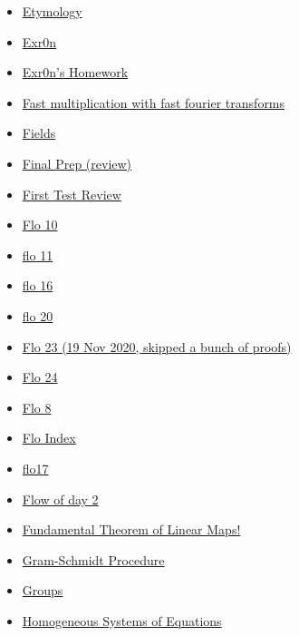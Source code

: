 \documentclass[11pt]{article}
\begin{document}
\begin{itemize}
\begin{itemize}
\begin{itemize}
\item \href{mathematics/linear\_algebra/KBe2020math530floLinalgEtymology.org}{Etymology}
\item \href{mathematics/linear\_algebra/KBe20math530flo12.org}{Exr0n}
\item \href{mathematics/linear\_algebra/KBe2020math530refExr0nRetIndex.org}{Exr0n's Homework}
\item \href{mathematics/linear\_algebra/KBe21math530floFastMultiplicationWithFFT.org}{Fast multiplication with fast fourier transforms}
\item \href{mathematics/linear\_algebra/KBe20math530refField.org}{Fields}
\item \href{mathematics/linear\_algebra/KBe20math530refFallFinalPrep.org}{Final Prep (review)}
\item \href{mathematics/linear\_algebra/KBxFirstTestReview.org}{First Test Review}
\item \href{mathematics/linear\_algebra/KBe20math530flo10.org}{Flo 10}
\item \href{mathematics/linear\_algebra/KBe20math530flo11.org}{flo 11}
\item \href{mathematics/linear\_algebra/KBe20math530flo16.org}{flo 16}
\item \href{mathematics/linear\_algebra/KBe20math530flo21.org}{flo 20}
\item \href{mathematics/linear\_algebra/KBe20math530flo23.org}{Flo 23 (19 Nov 2020, skipped a bunch of proofs)}
\item \href{mathematics/linear\_algebra/KBe20math530flo24.org}{Flo 24}
\item \href{mathematics/linear\_algebra/Kbe20math530flo8.org}{Flo 8}
\item \href{mathematics/linear\_algebra/KBe2020math530floIndex.org}{Flo Index}
\item \href{mathematics/linear\_algebra/KBe20math530flo17.org}{flo17}
\item \href{mathematics/linear\_algebra/KBe2020math530flo2.org}{Flow of day 2}
\item \href{mathematics/linear\_algebra/KBrefFundamentalTheoremOfLinearMaps.org}{Fundamental Theorem of Linear Maps!}
\item \href{mathematics/linear\_algebra/KBrefGramSchmidtProcedure.org}{Gram-Schmidt Procedure}
\item \href{mathematics/linear\_algebra/KBe2020math530refGroups.org}{Groups}
\item \href{mathematics/linear\_algebra/KBrefHomogeneousSystemsOfEquations.org}{Homogeneous Systems of Equations}

\end{itemize}
\end{itemize}
\end{itemize}
\end{document}
